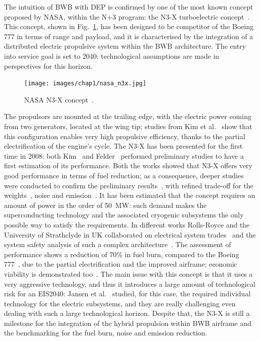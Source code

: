The intuition of BWB with DEP is confirmed by one of the most known concept proposed by NASA, within the N+3 program: the N3-X turboelectric concept~\cite{bib:kim_n3x_2008}. 
This concept, shown in Fig.~\ref{fig:nasa_n3x}, has been designed to be competitor of the Boeing 777 in terms of range and payload, and it is characterised by the integration of a distributed electric propulsive system within the BWB architecture. 
The entry into service goal is set to 2040: technological assumptions are made in perspectives for this horizon. 
\begin{figure}[!h]
	\centering
	\texttt{[image: images/chap1/nasa\_n3x.jpg]}
	\caption{NASA N3-X concept~\cite{bib:kim_n3x_2008}.}
	\label{fig:nasa_n3x}
\end{figure}
The propulsors are mounted at the trailing edge, with the electric power coming from two generators, located at the wing tip; studies from Kim et al.~\cite{bib:kim_2013} show that this configuration enables very high propulsive efficiency, thanks to the partial electrification of the engine's cycle. 
The N3-X has been presented for the first time in 2008: both Kim~\cite{bib:kim_n3x_2008} and Felder~\cite{bib:felder_2009} performed preliminary studies to have a first estimation of its performance. 
Both the works showed that N3-X offers very good performance in terms of fuel reduction; as a consequence, deeper studies were conducted to confirm the preliminary results~\cite{bib:felder_2012, bib:kim_n3x_2014}, with refined trade-off for the weights~\cite{bib:brown_n3x}, noise and emission~\cite{bib:berton}. 
It has been estimated that the concept requires an amount of power in the order of 50~\si{\mega\watt}: such demand makes the superconducting technology and the associated cryogenic subsystems the only possible way to satisfy the requirements. 
In different works Rolls-Royce and the University of Strathclyde in UK collaborated on electrical system trades~\cite{bib:armstrong_n3x_2012, bib:armstrong_n3x, bib:armstrong} and the system safety analysis of such a complex architecture~\cite{bib:ross, bib:shaw_2014, bib:shaw_2015}. The assessment of performance shows a reduction of 70\% in fuel burn, compared to the Boeing 777~\cite{bib:felder_2011}, due to the partial electrification and the improved airframe; economic viability is demonstrated too~\cite{bib:goldberg}. 
The main issue with this concept is that it uses a very aggressive technology, and thus it introduces a large amount of technological risk for an EIS2040: Jansen et al.~\cite{bib:jansen} studied, for this case, the required individual technology for the electric subsystems, and they are really challenging even dealing with such a large technological horizon. 
Despite that, the N3-X is still a milestone for the integration of the hybrid propulsion within BWB airframe and the benchmarking for the fuel burn, noise and emission reduction. 

